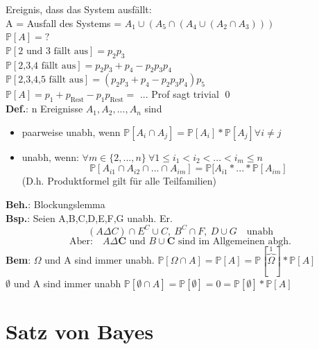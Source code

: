 Ereignis, dass das System ausfällt:\\
A = Ausfall des Systems = $A_1 \cup (A_5\cap (A_4 \cup (A_2 \cap A_3)))$\smallskip\\
$\mathds{P}[A] = ?$\\
$\mathds{P}[\text{2 und 3 fällt aus}] = p_2p_3$\smallskip\\
$\mathds{P}[\text{2,3,4 fällt aus}] = p_2p_3+p_4 -p_2p_3p_4$\smallskip\\
$\mathds{P}[\text{2,3,4,5 fällt aus}] = (p_2p_3+p_4-p_2p_3p_4)p_5$\smallskip\\
$\mathds{P}[A] = p_1 + p_\text{Rest} - p_1p_\text{Rest} =$ ... Prof sagt trivial \qed\medskip\\
\textbf{Def.}: n Ereignisse $A_1, A_2,...,A_n$ sind
\begin{itemize}
	\item paarweise unabh, wenn $\mathds{P}[A_i \cap A_j] = \mathds{P}[A_i] * \mathds{P}[A_j] \forall i \neq j$
	\item unabh, wenn: $\forall m \in \{2,...,n\} \: \forall 1 \leq i_1 < i_2 <...<i_m\leq n$
	$$\mathds{P}[A_{i1}\cap A_{i2}\cap ... \cap A_{im}] = \mathds{P}[A_{i1}* ... * \mathds{P}[A_{im}]$$
	(D.h. Produktformel gilt für alle Teilfamilien)
\end{itemize} 
\textbf{Beh.}: Blockungslemma\\
\textbf{Bsp.}: Seien A,B,C,D,E,F,G unabh. Er.
$$(A \Delta C) \cap E^C \cup C, \: B^C\cap F,\: D\cup G \quad \text{unabh}$$ 
$$\text{Aber:} \quad A \Delta \mathbf{C} \text{ und } B \cup \mathbf{C} \text{ sind im Allgemeinen abgh.}$$
\textbf{Bem}: $\Omega$ und A sind immer unabh. \hspace{1cm} $\mathds{P}[\Omega \cap A] = \mathds{P}[A]=\mathds{P}[\overbrace{\Omega}^1]*\mathds{P}[A]$\\
$\emptyset$ und A sind immer unabh \hspace{1cm} $\mathds{P}[\emptyset \cap A] = \mathds{P}[\emptyset]=0=\mathds{P}[\emptyset]*\mathds{P}[A]$
\chapter{Satz von Bayes}
